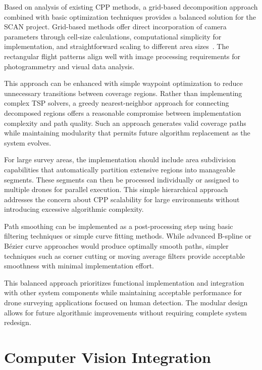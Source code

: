 Based on analysis of existing CPP methods, a grid-based decomposition approach combined with basic optimization techniques provides a balanced solution for the SCAN project. Grid-based methods offer direct incorporation of camera parameters through cell-size calculations, computational simplicity for implementation, and straightforward scaling to different area sizes~\cite{MathworksUAV}. The rectangular flight patterns align well with image processing requirements for photogrammetry and visual data analysis.

This approach can be enhanced with simple waypoint optimization to reduce unnecessary transitions between coverage regions. Rather than implementing complex TSP solvers, a greedy nearest-neighbor approach for connecting decomposed regions offers a reasonable compromise between implementation complexity and path quality. Such an approach generates valid coverage paths while maintaining modularity that permits future algorithm replacement as the system evolves.

For large survey areas, the implementation should include area subdivision capabilities that automatically partition extensive regions into manageable segments. These segments can then be processed individually or assigned to multiple drones for parallel execution. This simple hierarchical approach addresses the concern about CPP scalability for large environments without introducing excessive algorithmic complexity.

Path smoothing can be implemented as a post-processing step using basic filtering techniques or simple curve fitting methods. While advanced B-spline or Bézier curve approaches would produce optimally smooth paths, simpler techniques such as corner cutting or moving average filters provide acceptable smoothness with minimal implementation effort.

This balanced approach prioritizes functional implementation and integration with other system components while maintaining acceptable performance for drone surveying applications focused on human detection. The modular design allows for future algorithmic improvements without requiring complete system redesign.

\section{Computer Vision Integration}

